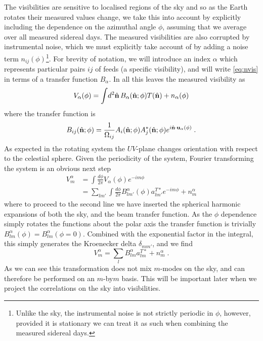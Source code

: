 \documentclass[prd,twocolumn,nofootinbib]{revtex4}
\begin{document}
The visibilities are sensitive to localised regions of the sky and so as the
Earth rotates their measured values change, we take this into account by
explicitly including the dependence on the azimuthal angle $\phi$, assuming that
we average over all measured sidereal days. The measured visibilities are also
corrupted by instrumental noise, which we must explicitly take account of by
adding a noise term $n_{ij}(\phi)$\footnote{Unlike the sky, the instrumental
  noise is not strictly periodic in $\phi$, however, provided it is stationary
  we can treat it as such when combining the measured sidereal days.}. For
brevity of notation, we will introduce an index $\alpha$ which represents
particular pairs $ij$ of feeds (a specific visibility), and will write
\eqref{eq:nvis} in terms of a transfer function $B_\alpha$. In all this leaves
the measured visibility as
\begin{equation}
  V_\alpha(\phi) = \int \! d^2\hat{\mathbf{n}}\, B_\alpha(\hat{\mathbf{n}}; \phi) T(\hat{\mathbf{n}}) + n_\alpha(\phi)
\end{equation}
where the transfer function is
\begin{equation}
  B_{ij}(\hat{\mathbf{n}}; \phi) = \frac{1}{\Omega_{ij}}A_i(\hat{\mathbf{n}}; \phi) A_j^*(\hat{\mathbf{n}}; \phi) e^{i \hat{\mathbf{n}} \cdot\mathbf{u}_{\alpha}(\phi)} \; .
\end{equation}
As expected in the rotating system the $UV$-plane changes orientation with
respect to the celestial sphere. Given the periodicity of the system, Fourier
transforming the system is an obvious next step
\begin{align}
  V^\alpha_m &= \int \frac{d\phi}{2\pi} V_\alpha(\phi) e^{-i m \phi} \\
  & = \sum_{l m'}\int \frac{d\phi}{2\pi} B^\alpha_{l m'}(\phi) a^{T*}_{l m'}
  e^{-i m \phi}+ n^\alpha_m
\end{align}
where to proceed to the second line we have inserted the spherical harmonic
expansions of both the sky, and the beam transfer function. As the $\phi$
dependence simply rotates the functions about the polar axis the transfer
function is trivially $B^\alpha_{lm}(\phi) = B^{\alpha}_{lm}(\phi=0)$. Combined
with the exponential factor in the integral, this simply generates the
Kroenecker delta $\delta_{mm'}$, and we find
\begin{equation}
\label{eq:vis_unpol}
V^\alpha_m = \sum_{l} B^\alpha_{l m} a^{T*}_{l m}+ n^\alpha_m \; .
\end{equation}
As we can see this transformation does not mix $m$-modes on the sky, and can
therefore be performed on an $m$-by$m$ basis. This will be important later when
we project the correlations on the sky into visibilities.
\end{document}
